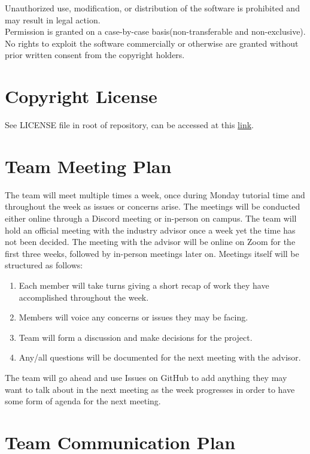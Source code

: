 \documentclass{article}
\begin{document}
Unauthorized use, modification, or distribution of the software is prohibited and may result in legal action.
\\

\hspace{\parindent} Permission is granted on a case-by-case basis(non-transferable and non-exclusive). No rights to exploit the software commercially or otherwise are granted without prior written consent from the copyright holders.

\section{Copyright License}

See LICENSE file in root of repository, can be accessed at this \href{https://github.com/ssm-lab/capstone--source-code-optimizer/blob/main/LICENSE}{link}.

\section{Team Meeting Plan}

\hspace{\parindent} The team will meet multiple times a week, once during Monday tutorial time and throughout the week as issues or concerns arise. The meetings will be conducted either online through a Discord meeting or in-person on campus. The team
will hold an official meeting with the industry advisor once a week yet the time has not been decided. The meeting with the advisor will be online on Zoom for the first three weeks, followed by in-person meetings later on. Meetings itself will be structured as follows:
\begin{enumerate}
  \item Each member will take turns giving a short recap of work they have accomplished throughout the week.
  \item Members will voice any concerns or issues they may be facing.
  \item Team will form a discussion and make decisions for the project.
  \item Any/all questions will be documented for the next meeting with the advisor.
\end{enumerate}
The team will go ahead and use Issues on GitHub to add anything they may want to talk about in the next meeting as the week progresses in order to have some form of agenda for the next meeting.

\section{Team Communication Plan}
\end{document}
